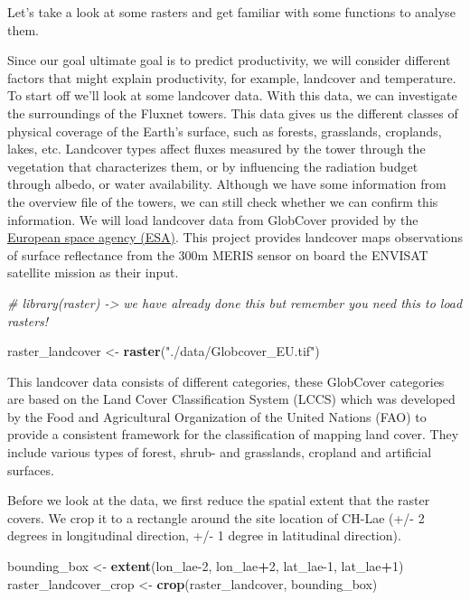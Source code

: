 \documentclass[
]{book}
\newenvironment{Shaded}{\begin{snugshade}}{\end{snugshade}}
\newcommand{\CommentTok}[1]{\textcolor[rgb]{0.56,0.35,0.01}{\textit{#1}}}
\newcommand{\DecValTok}[1]{\textcolor[rgb]{0.00,0.00,0.81}{#1}}
\newcommand{\KeywordTok}[1]{\textcolor[rgb]{0.13,0.29,0.53}{\textbf{#1}}}
\newcommand{\NormalTok}[1]{#1}
\newcommand{\OperatorTok}[1]{\textcolor[rgb]{0.81,0.36,0.00}{\textbf{#1}}}
\newcommand{\StringTok}[1]{\textcolor[rgb]{0.31,0.60,0.02}{#1}}
\begin{document}
Let's take a look at some rasters and get familiar with some functions to analyse them.

Since our goal ultimate goal is to predict productivity, we will consider different factors that might explain productivity, for example, landcover and temperature.
To start off we'll look at some landcover data. With this data, we can investigate the surroundings of the Fluxnet towers. This data gives us the different classes of physical coverage of the Earth's surface, such as forests, grasslands, croplands, lakes, etc. Landcover types affect fluxes measured by the tower through the vegetation that characterizes them, or by influencing the radiation budget through albedo, or water availability. Although we have some information from the overview file of the towers, we can still check whether we can confirm this information. We will load landcover data from GlobCover provided by the \href{http://due.esrin.esa.int/page_globcover.php}{European space agency (ESA)}. This project provides landcover maps observations of surface reflectance from the 300m MERIS sensor on board the ENVISAT satellite mission as their input.

\begin{Shaded}
\begin{Highlighting}[]
\CommentTok{# library(raster) -> we have already done this but remember you need this to load rasters!}

\NormalTok{raster_landcover <-}\StringTok{ }\KeywordTok{raster}\NormalTok{(}\StringTok{"./data/Globcover_EU.tif"}\NormalTok{)}
\end{Highlighting}
\end{Shaded}

This landcover data consists of different categories, these GlobCover categories are based on the Land Cover Classification System (LCCS) which was
developed by the Food and Agricultural Organization of the United Nations (FAO) to provide a consistent framework for the classification of mapping land cover. They include various types of forest, shrub- and grasslands, cropland and artificial surfaces.

Before we look at the data, we first reduce the spatial extent that the raster covers. We crop it to a rectangle around the site location of CH-Lae (+/- 2 degrees in longitudinal direction, +/- 1 degree in latitudinal direction).

\begin{Shaded}
\begin{Highlighting}[]
\NormalTok{bounding_box <-}\StringTok{ }\KeywordTok{extent}\NormalTok{(lon_lae}\DecValTok{-2}\NormalTok{, lon_lae}\OperatorTok{+}\DecValTok{2}\NormalTok{, lat_lae}\DecValTok{-1}\NormalTok{, lat_lae}\OperatorTok{+}\DecValTok{1}\NormalTok{)}
\NormalTok{raster_landcover_crop <-}\StringTok{ }\KeywordTok{crop}\NormalTok{(raster_landcover, bounding_box)}
\end{Highlighting}
\end{Shaded}
\end{document}
